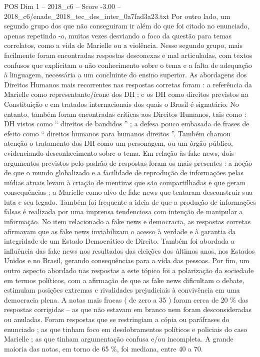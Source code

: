\begin{textsample}{POS Dim 1 – 2018\_c6 – Score -3.00 – 2018\_c6/enade\_2018\_tec\_des\_inter\_0a7fad3a23.txt}
Por outro lado, um segundo grupo dos que não conseguiram ir além do que foi citado no enunciado, apenas repetindo -o, muitas vezes desviando o foco da questão para temas correlatos, como a vida de Marielle ou a violência.
Nesse segundo grupo, mais facilmente foram encontradas respostas desconexas e mal articuladas, com textos confusos que explicitam o não conhecimento sobre o tema e a falta de adequação à linguagem, necessária a um concluinte do ensino superior.
As abordagens dos Direitos Humanos mais recorrentes nas respostas corretas foram : a referência da Marielle como representante/ícone dos DH ; e os DH como direitos previstos na Constituição e em tratados internacionais dos quais o Brasil é signatário.
No entanto, também foram encontradas críticas aos Direitos Humanos, tais como : DH vistos como “ direitos de bandidos ” ; a defesa pouco embasada de frases de efeito como “ direitos humanos para humanos direitos ”.
Também chamou atenção o tratamento dos DH como um personagem, ou um órgão público, evidenciando desconhecimento sobre o tema.
Em relação às fake news, dois argumentos previstos pelo padrão de respostas foram os mais presentes : a noção de que o mundo globalizado e a facilidade de reprodução de informações pelas mídias atuais levam à criação de mentiras que são compartilhadas e que geram consequências ; a Marielle como alvo de fake news que tentaram desconstruir sua luta e seu legado.
Também foi frequente a ideia de que a produção de informações falsas é realizada por uma imprensa tendenciosa com intenção de manipular a informação.
No item relacionado a fake news e democracia, as respostas corretas afirmavam que as fake news inviabilizam o acesso à verdade e à garantia da integridade de um Estado Democrático de Direito.
Também foi abordada a influência das fake news nos resultados das eleições dos últimos anos, nos Estados Unidos e no Brasil, gerando consequências para a vida das pessoas.
Por fim, um outro aspecto abordado nas respostas a este tópico foi a polarização da sociedade em termos políticos, com a afirmação de que as fake news dificultam o debate, estimulam posições extremas e rivalidades prejudiciais à convivência em uma democracia plena.
A notas mais fracas ( de zero a 35 ) foram cerca de 20 \% das respostas corrigidas – as que não estavam em branco nem foram desconsideradas ou anuladas.
Foram respostas que se restringiam a cópia ou paráfrases do enunciado ; as que tinham foco em desdobramentos políticos e policiais do caso Marielle ; as que tinham argumentação confusa e/ou incompleta.
A grande maioria das notas, em torno de 65 \%, foi mediana, entre 40 a 70.

\end{textsample}
